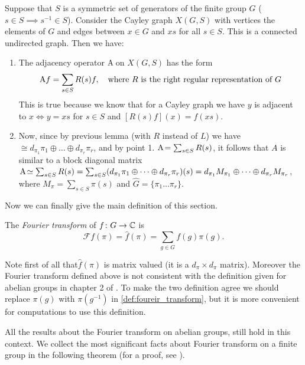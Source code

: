 \begin{rem}
Suppose  that $S$  is  a  symmetric  set  of  generators  of  the finite group $G$ ($s\in S \implies s^{-1}\in S$). Consider the Cayley graph $X(G,S)$   with vertices the elements  of $G$  and edges between $x \in G$   and $xs$  for  all $s\in S$.  This is a connected undirected  graph. Then we have:
\begin{enumerate}
\item The adjacency operator $\operatorname{A\!}$ on $X(G,S)$ has the form
\[
\operatorname{A\!} f = \sum_{s\in S}R(s)f, \quad \text{where $R$ is the right regular representation of $G$} \]
This is true because we know that for a Cayley graph we have $y$ is adjacent to $x \iff y=xs$ for $s\in S$ and $[R(s)f](x)=f(xs)$.
\item Now, since by previous lemma (with $R$ instead of $L$) we have $\cong d_{\pi_1}\pi_1\oplus\dots\oplus d_{\pi_r}\pi_r$, and by point 1. $\operatorname{A\!}=\sum_{s\in S}R(s)$, it follows that $A$ is similar to a block diagonal matrix $\operatorname{A\!} \simeq \sum_{s\in S}R(s)=\sum_{s\in S}(d_{\pi_1}\pi_1\oplus\dots\oplus d_{\pi_r}\pi_r)(s)= d_{\pi_1}M_{\pi_1}\oplus\dots\oplus d_{\pi_r}M_{\pi_r}$, where $M_\pi=\sum_{s\in S}\pi(s)$ and $\hat{G}=\{\pi_1\dots\pi_r\}$.
\end{enumerate}
\end{rem}
Now we can finally give the main definition of this section.
\begin{defn}
The \emph{Fourier transform} of $f\colon G\rightarrow {\mathbb C}$ is
\begin{equation}
\label{def:foureir_transform}
\mathscr{F}f(\pi)=\hat{f}(\pi)=\sum_{g\in G} f(g)\pi(g).
\end{equation}
\end{defn}
\begin{rem}
Note first of all that$\hat{f}(\pi)$ is matrix valued (it is a $d_\pi\times d_\pi$ matrix). Moreover the Fourier transform  defined  above is not consistent with the definition given for abelian groups in chapter 2 of \cite{terras_1999}. To make the two definition agree we should replace $\pi(g)$ with $\pi(g^{-1})$ in \eqref{def:foureir_transform}, but it is more convenient for computations to use this  definition.
\end{rem}
All the results about the Fourier transform on abelian groups, still hold in this context. We collect the most significant facts about Fourier transform on a finite group in the following theorem (for a proof, see \cite{terras_1999}).
